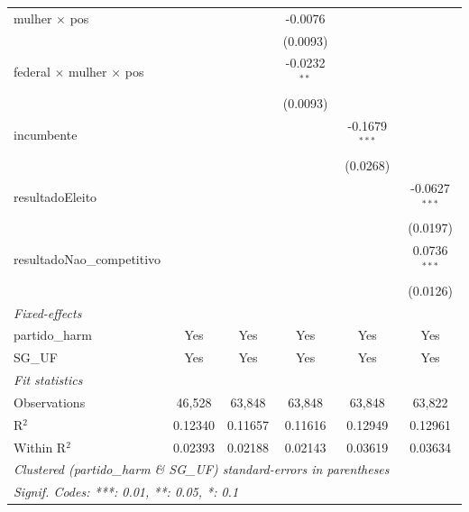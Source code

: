 \begin{tabular}{lccccc}
   mulher $\times$ pos                        &                       &                 & -0.0076         &                    &   \\   
                                              &                       &                 & (0.0093)        &                    &   \\   
   federal $\times$ mulher $\times$ pos       &                       &                 & -0.0232$^{**}$  &                    &   \\   
                                              &                       &                 & (0.0093)        &                    &   \\   
   incumbente                                 &                       &                 &                 & -0.1679$^{***}$    &   \\   
                                              &                       &                 &                 & (0.0268)           &   \\   
   resultadoEleito                            &                       &                 &                 &                    & -0.0627$^{***}$\\   
                                              &                       &                 &                 &                    & (0.0197)\\   
   resultadoNao\_competitivo                  &                       &                 &                 &                    & 0.0736$^{***}$\\   
                                              &                       &                 &                 &                    & (0.0126)\\   
   \midrule
   \emph{Fixed-effects}\\
   partido\_harm                              & Yes                   & Yes             & Yes             & Yes                & Yes\\  
   SG\_UF                                     & Yes                   & Yes             & Yes             & Yes                & Yes\\  
   \midrule
   \emph{Fit statistics}\\
   Observations                               & 46,528                & 63,848          & 63,848          & 63,848             & 63,822\\  
   R$^2$                                      & 0.12340               & 0.11657         & 0.11616         & 0.12949            & 0.12961\\  
   Within R$^2$                               & 0.02393               & 0.02188         & 0.02143         & 0.03619            & 0.03634\\  
   \midrule \midrule
   \multicolumn{6}{l}{\emph{Clustered (partido\_harm \& SG\_UF) standard-errors in parentheses}}\\
   \multicolumn{6}{l}{\emph{Signif. Codes: ***: 0.01, **: 0.05, *: 0.1}}\\
\end{tabular}
\par\endgroup


